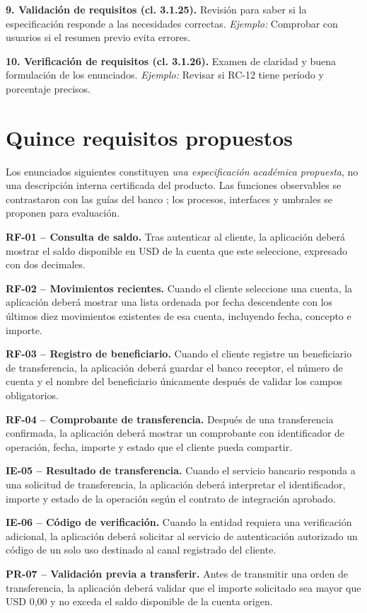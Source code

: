 \documentclass[conference,a4paper]{IEEEtran}
\newcommand{\requisito}[3]{\par\noindent\textbf{#1 -- #2.} #3\par\vspace{1pt}}
\begin{document}
\noindent\textbf{9. Validación de requisitos (cl. 3.1.25).} Revisión para saber si la especificación responde a las necesidades correctas. \emph{Ejemplo:} Comprobar con usuarios si el resumen previo evita errores.

\noindent\textbf{10. Verificación de requisitos (cl. 3.1.26).} Examen de claridad y buena formulación de los enunciados. \emph{Ejemplo:} Revisar si RC-12 tiene período y porcentaje precisos.

\section{Quince requisitos propuestos}\label{sec:req}
Los enunciados siguientes constituyen \emph{una especificación académica propuesta}, no una descripción interna certificada del producto. Las funciones observables se contrastaron con las guías del banco \cite{ayudaBG,saldosBG,comproBG}; los procesos, interfaces y umbrales se proponen para evaluación.
\requisito{RF-01}{Consulta de saldo}{Tras autenticar al cliente, la aplicación deberá mostrar el saldo disponible en USD de la cuenta que este seleccione, expresado con dos decimales.}
\requisito{RF-02}{Movimientos recientes}{Cuando el cliente seleccione una cuenta, la aplicación deberá mostrar una lista ordenada por fecha descendente con los últimos diez movimientos existentes de esa cuenta, incluyendo fecha, concepto e importe.}
\requisito{RF-03}{Registro de beneficiario}{Cuando el cliente registre un beneficiario de transferencia, la aplicación deberá guardar el banco receptor, el número de cuenta y el nombre del beneficiario únicamente después de validar los campos obligatorios.}
\requisito{RF-04}{Comprobante de transferencia}{Después de una transferencia confirmada, la aplicación deberá mostrar un comprobante con identificador de operación, fecha, importe y estado que el cliente pueda compartir.}
\requisito{IE-05}{Resultado de transferencia}{Cuando el servicio bancario responda a una solicitud de transferencia, la aplicación deberá interpretar el identificador, importe y estado de la operación según el contrato de integración aprobado.}
\requisito{IE-06}{Código de verificación}{Cuando la entidad requiera una verificación adicional, la aplicación deberá solicitar al servicio de autenticación autorizado un código de un solo uso destinado al canal registrado del cliente.}
\requisito{PR-07}{Validación previa a transferir}{Antes de transmitir una orden de transferencia, la aplicación deberá validar que el importe solicitado sea mayor que USD 0,00 y no exceda el saldo disponible de la cuenta origen.}
\end{document}
